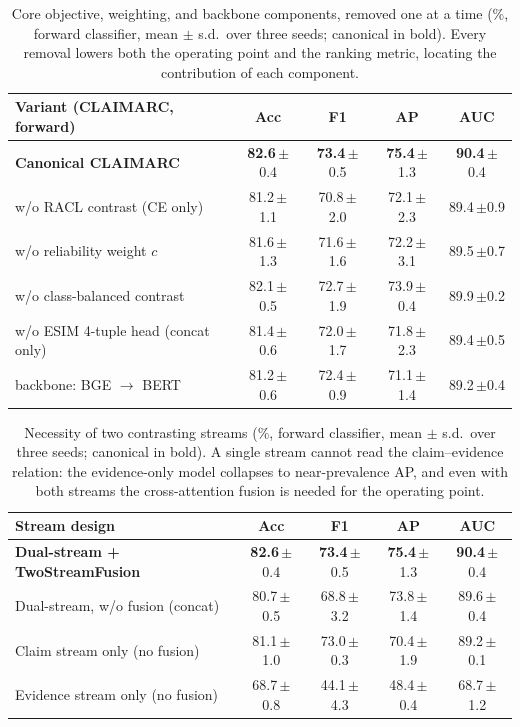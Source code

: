 \documentclass[11pt]{article}
\newcommand{\best}[1]{\textbf{#1}}
\begin{document}
\begin{table}[t]
\centering\small
\setlength{\tabcolsep}{6pt}
\newcommand{\pmsd}[1]{\,{\scriptsize$\pm$#1}}
\begin{tabular}{lcccc}
\toprule
\textbf{Variant (CLAIMARC, forward)} & \textbf{Acc} & \textbf{F1} & \textbf{AP} & \textbf{AUC} \\
\midrule
\textbf{Canonical CLAIMARC}          & \best{82.6}\pmsd{0.4} & \best{73.4}\pmsd{0.5} & \best{75.4}\pmsd{1.3} & \best{90.4}\pmsd{0.4} \\
\midrule
\quad w/o RACL contrast (CE only)    & 81.2\pmsd{1.1} & 70.8\pmsd{2.0} & 72.1\pmsd{2.3} & 89.4\pmsd{0.9} \\
\quad w/o reliability weight $c$     & 81.6\pmsd{1.3} & 71.6\pmsd{1.6} & 72.2\pmsd{3.1} & 89.5\pmsd{0.7} \\
\quad w/o class-balanced contrast    & 82.1\pmsd{0.5} & 72.7\pmsd{1.9} & 73.9\pmsd{0.4} & 89.9\pmsd{0.2} \\
\quad w/o ESIM 4-tuple head (concat only) & 81.4\pmsd{0.6} & 72.0\pmsd{1.7} & 71.8\pmsd{2.3} & 89.4\pmsd{0.5} \\
\quad backbone: BGE $\to$ BERT       & 81.2\pmsd{0.6} & 72.4\pmsd{0.9} & 71.1\pmsd{1.4} & 89.2\pmsd{0.4} \\
\bottomrule
\end{tabular}
\caption{Core objective, weighting, and backbone components, removed one at a time
(\%, forward classifier, mean $\pm$ s.d.\ over three seeds; canonical in bold).
Every removal lowers both the operating point and the ranking metric, locating
the contribution of each component.}
\label{tab:abl}
\end{table}

\begin{table}[t]
\centering\small
\setlength{\tabcolsep}{6pt}
\newcommand{\pmsd}[1]{\,{\scriptsize$\pm$#1}}
\begin{tabular}{lcccc}
\toprule
\textbf{Stream design} & \textbf{Acc} & \textbf{F1} & \textbf{AP} & \textbf{AUC} \\
\midrule
\textbf{Dual-stream + TwoStreamFusion} & \best{82.6}\pmsd{0.4} & \best{73.4}\pmsd{0.5} & \best{75.4}\pmsd{1.3} & \best{90.4}\pmsd{0.4} \\
\midrule
\quad Dual-stream, w/o fusion (concat) & 80.7\pmsd{0.5} & 68.8\pmsd{3.2} & 73.8\pmsd{1.4} & 89.6\pmsd{0.4} \\
\quad Claim stream only (no fusion)    & 81.1\pmsd{1.0} & 73.0\pmsd{0.3} & 70.4\pmsd{1.9} & 89.2\pmsd{0.1} \\
\quad Evidence stream only (no fusion) & 68.7\pmsd{0.8} & 44.1\pmsd{4.3} & 48.4\pmsd{0.4} & 68.7\pmsd{1.2} \\
\bottomrule
\end{tabular}
\caption{Necessity of two contrasting streams (\%, forward classifier, mean
$\pm$ s.d.\ over three seeds; canonical in bold). A single stream cannot read the
claim--evidence relation: the evidence-only model collapses to near-prevalence AP,
and even with both streams the cross-attention fusion is needed for the operating
point.}
\label{tab:abl_stream}
\end{table}
\end{document}
